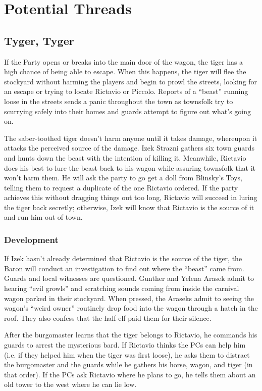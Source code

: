 \documentclass[a4paper,11pt]{article}
\begin{document}
\section{Potential Threads}
\label{sec:PotentialThreads}
\subsection{Tyger, Tyger}
If the Party opens or breaks into the main door of the wagon, the tiger has a high chance of being able to escape.
When this happens, the tiger will flee the stockyard without harming the players and begin to prowl the streets,
looking for an escape or trying to locate Rictavio or Piccolo. Reports of a ``beast'' running loose in the streets 
sends a panic throughout the town as townsfolk try to scurrying safely into their homes and guards attempt to 
figure out what's going on.

The saber-toothed tiger doesn't harm anyone until it takes damage, whereupon it attacks the perceived source of
the damage. Izek Strazni gathers six town guards and hunts down the beast with the intention of killing it.
Meanwhile, Rictavio does his best to lure the beast back to his wagon while assuring townsfolk that it won't harm
them. He will ask the party to go get a doll from Blinsky's Toys, telling them to request a duplicate of the one 
Rictavio ordered. If the party achieves this without dragging things out too long, Rictavio will succeed in luring 
the tiger back secretly; otherwise, Izek will know that Rictavio is the source of it and run him out of town.

\subsubsection{Development}
If Izek hasn't already determined that Rictavio is the source of the tiger, the Baron will conduct an 
investigation to find out where the ``beast'' came from. Guards and local witnesses are questioned. Gunther and 
Yelena Arasek admit to hearing ``evil growls'' and scratching sounds coming from inside the carnival wagon parked 
in their stockyard. When pressed, the Araseks admit to seeing the wagon's ``weird owner'' routinely drop food into 
the wagon through a hatch in the roof. They also confess that the half-elf paid them for their silence.

After the burgomaster learns that the tiger belongs to Rictavio, he commands his guards to arrest the mysterious 
bard. If Rictavio thinks the PCs can help him (i.e. if they helped him when the tiger was first loose), he asks 
them to distract the burgomaster and the guards while he gathers his horse, wagon, and tiger (in that order). If 
the PCs ask Rictavio where he plans to go, he tells them about an old tower to the west where he can lie low.
\end{document}

